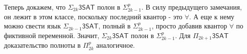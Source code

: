 Теперь докажем, что $\Sigma_{2k}\mathsf{3SAT}$ полон в $\Sigma_{2k-1}^p$. В силу предыдущего замечания, он лежит в этом классе, поскольку последний квантор - это $\forall$. А еще к нему можно свести язык $\Sigma_{2k-1}\mathsf{3SAT}$, полный в $\Sigma_{2k-1}^p$, просто добавив квантор $\forall$ по фиктивной переменной. Значит, $\Sigma_{2k}\mathsf{3SAT}$ полон в $\Sigma_{2k-1}^p$. Для $\Pi_{2k+1}\mathsf{3SAT}$ доказательство полноты в $\Pi_{2k}^p$ аналогичное.


